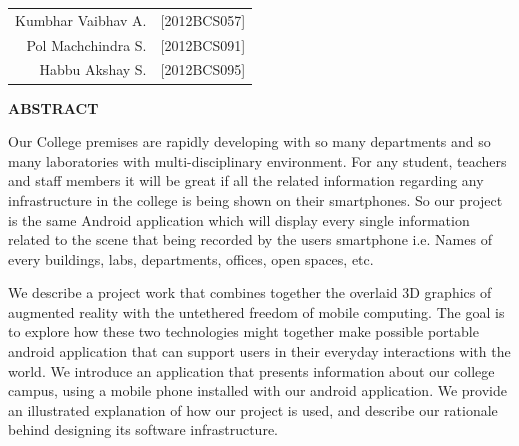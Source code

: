 \documentclass{article}
\begin{document}
\begin{flushright}
\begin{minipage}{.5\linewidth}

\begin{tabular}{rr}
	\large Kumbhar Vaibhav A. &\large [2012BCS057]\\
	\large Pol Machchindra  S. &\large [2012BCS091] \\
	\large Habbu Akshay S. &\large [2012BCS095]\\
\end{tabular}
\end{minipage}
\end{flushright}




\newpage

\setlength{\parskip}{.5cm}
\begin{center}
{\LARGE \textbf{ ABSTRACT}}\\[1cm]
\end{center}
\large
	\par Our College premises are rapidly developing with so many departments and so many laboratories with multi-disciplinary environment. For any student, teachers and staff members it will be great if all the related information regarding any infrastructure in the college is being shown on their smartphones. So our project is the same Android application which will display every single information related to the scene that being recorded by the users smartphone i.e. Names of every buildings, labs, departments, offices, open spaces, etc. 
	\par We describe a project work that combines together the overlaid 3D graphics of augmented reality with the untethered freedom of mobile computing. The goal is to explore how these two technologies might together make possible portable android application that can support users in their everyday interactions with the world. We introduce an application that presents information about our college campus, using a mobile phone installed with our android application. We provide an illustrated explanation of how our project is used, and describe our rationale behind designing its software infrastructure.

\normalsize 
\end{document}
